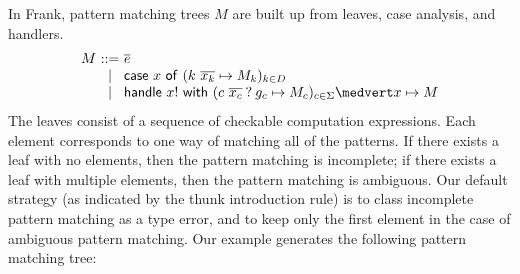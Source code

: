\documentclass[preprint]{sigplanconf}
\makeatletter
\newcommand{\many}{\overline}
\newcommand\ba{\begin{array}}
\newcommand\ea{\end{array}}
\newenvironment{equations}{\[\ba{@{}r@{~}c@{~}l@{}}}{\ea\]}
\newcommand{\sigs}{\Sigma}
\newcommand{\effbox}[1]{[#1]}
\newcommand{\key}[1]{\mathsf{#1}}
\newcommand{\handleSymbol}{\mathbin{?}}
\newcommand{\handle}[2]{{#1} \handleSymbol {#2}}
\newcommand{\force}[1]{{#1}!}
\makeatother
\begin{document}
In Frank, pattern matching trees $M$ are built up from leaves, case
analysis, and handlers.
\begin{equations}
M &::= & \many{e} \\
  &\mid& \key{case}~x~\key{of}~(k~\many{x_k} \mapsto M_k)_{k \in D} \\
  &\mid& \key{handle}~\force{x}~\key{with}~
          (\handle{c~\many{x_c}}{g_c} \mapsto M_c)_{c \in \sigs} \medvert
          x        \mapsto M
\end{equations}%
The leaves consist of a sequence of checkable computation
expressions. Each element corresponds to one way of matching all of
the patterns. If there exists a leaf with no elements, then the
pattern matching is incomplete; if there exists a leaf with multiple
elements, then the pattern matching is ambiguous.
%
Our default strategy (as indicated by the thunk introduction rule) is
to class incomplete pattern matching as a type error, and to keep only
the first element in the case of ambiguous pattern matching.
%
Our example generates the following pattern matching tree:
\end{document}
